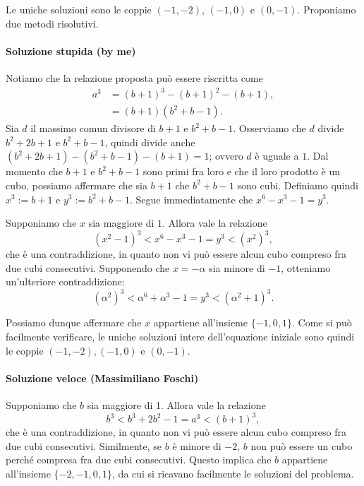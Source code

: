\documentclass{article}
\begin{document}
Le uniche soluzioni sono le coppie $(-1,-2)$, $(-1,0)$ e $(0,-1)$.
Proponiamo due metodi risolutivi.

\paragraph{Soluzione stupida (by me)}

Notiamo che la relazione proposta può essere riscritta come
\begin{align*}
	a^3 &= (b+1)^3-(b+1)^2-(b+1), \\
		 &= (b+1)(b^2+b-1).
\end{align*}
Sia $d$ il massimo comun divisore di $b+1$ e $b^2+b-1$.
Osserviamo che $d$ divide
$b^2+2b+1$ e $b^2+b-1$, quindi divide anche $(b^2+2b+1)-(b^2+b-1)-(b+1)=1$;
ovvero $d$ è uguale a $1$.
Dal momento che $b+1$ e $b^2+b-1$ sono primi fra loro e che il loro prodotto
è un cubo, possiamo affermare che sia $b+1$ che $b^2+b-1$ sono cubi.
Definiamo quindi
$x^3:=b+1$ e $y^3:=b^2+b-1$. Segue immediatamente che $x^6-x^3-1=y^3$.

Supponiamo che $x$ sia maggiore di $1$. Allora vale la relazione
\begin{equation*}
	(x^2-1)^3 < x^6-x^3-1=y^3 < (x^2)^3,
\end{equation*}
che è una contraddizione, in quanto non vi può essere alcun cubo compreso
fra due cubi consecutivi. Supponendo che $x=-\alpha$ sia
minore di $-1$, otteniamo un'ulteriore contraddizione:
\begin{equation*}
	(\alpha^2)^3 < \alpha^6 + \alpha^3 -1=y^3 < (\alpha^2+1)^3.
\end{equation*}

Possiamo dunque affermare che $x$ appartiene all'insieme $\{ -1,0,1 \}$.
Come si può facilmente verificare,
le uniche soluzioni intere dell'equazione iniziale sono quindi le coppie
$(-1,-2),(-1,0)$ e $(0,-1)$.


\paragraph{Soluzione veloce (Massimiliano Foschi)}

Supponiamo che $b$ sia maggiore di 1. Allora vale
la relazione
\begin{equation*}
	b^3<b^3+2b^2-1=a^3<(b+1)^3,
\end{equation*}
che è una contraddizione, in quanto non vi può essere alcun cubo
compreso fra due cubi consecutivi.
Similmente, se $b$ è minore di $-2$, $b$ non può essere un cubo
perché compresa fra due cubi consecutivi. Questo implica che $b$ appartiene
all'insieme $\{-2,-1,0,1 \}$, da cui si ricavano facilmente le soluzioni del
problema.
\end{document}
